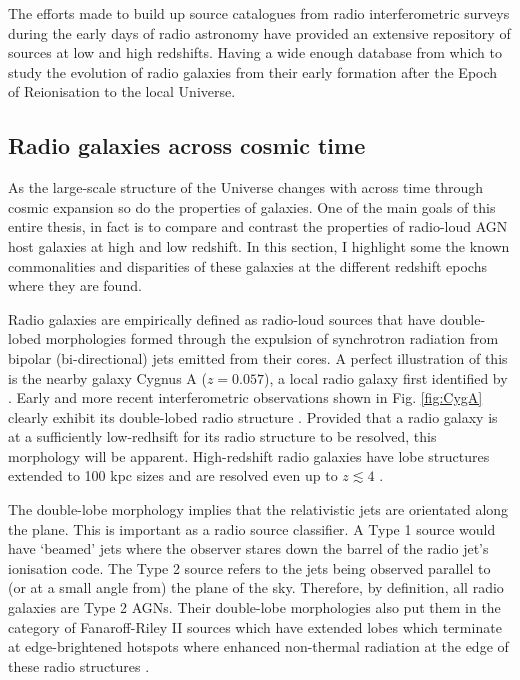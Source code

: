 \documentclass[10pt,a4paper]{article}
\begin{document}
The efforts made to build up source catalogues from radio interferometric surveys during the early days of radio astronomy have provided an extensive repository of sources at low and high redshifts. Having a wide enough database from which to study the evolution of radio galaxies from their early formation after the Epoch of Reionisation to the local Universe. 

\subsection{Radio galaxies across cosmic time}
As the large-scale structure of the Universe changes with across time through cosmic expansion \citep{Planck2016} so do the properties of galaxies. One of the main goals of this entire thesis, in fact is to compare and contrast the properties of radio-loud AGN host galaxies at high and low redshift. In this section, I highlight some the known commonalities and disparities of these galaxies at the different redshift epochs where they are found.  

Radio galaxies are empirically defined as radio-loud sources that have double-lobed morphologies formed through the expulsion of synchrotron radiation from bipolar (bi-directional) jets emitted from their cores. 
A perfect illustration of this is the nearby galaxy Cygnus A ($z=0.057$), a local radio galaxy first identified by \citet{JennisonDasGupta1953}. Early and more recent interferometric observations shown in Fig. \ref{fig:CygA} clearly exhibit its double-lobed radio structure \citep{Moffet1966,CarilliBarthel1996}. Provided that a radio galaxy is at a sufficiently low-redhsift for its radio structure to be resolved, this morphology will be apparent. High-redshift radio galaxies have lobe structures extended to 100 kpc sizes and are resolved even up to $z \lesssim 4$ \citep{Miley1980,Carilli1997,pentericci1999}.  

The double-lobe morphology implies that the relativistic jets are orientated along the plane. This is important as a radio source classifier. A Type 1 source would have `beamed' jets where the observer stares down the barrel of the radio jet's ionisation code. The Type 2 source refers to the jets being observed parallel to (or at a small angle from) the plane of the sky. Therefore, by definition, all radio galaxies are Type 2 AGNs. Their double-lobe morphologies also put them in the category of Fanaroff-Riley II sources which have extended lobes which terminate at edge-brightened hotspots where enhanced non-thermal radiation at the edge of these radio structures \citep{FanaroffRiley1974}. 
\end{document}

